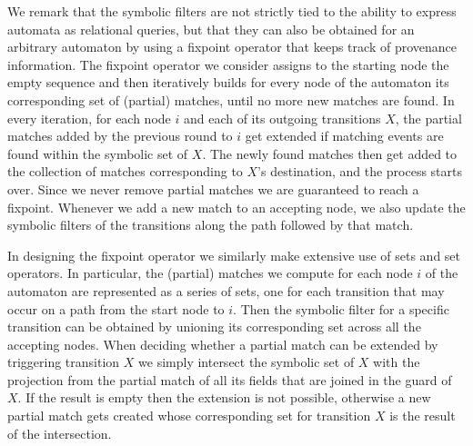 We remark that the symbolic filters are not strictly tied to the ability to 
express automata as relational queries, but that they can also be obtained for 
an arbitrary automaton by using a fixpoint operator that keeps track of 
provenance information.
The fixpoint operator we consider assigns to the starting node the empty 
sequence and then iteratively builds for every node of the automaton its 
corresponding set of (partial) matches, until no more new matches are found. 
In every iteration, for each node $i$ and each of its outgoing transitions $X$, 
the partial matches added by the previous round to $i$ get extended if matching 
events are found within the symbolic set of $X$. 
The newly found matches then get added to the collection of matches 
corresponding to $X$'s destination, and the process starts over.  
Since we never remove partial matches we are guaranteed to reach a fixpoint.
Whenever we add a new match to an accepting node, we also update the symbolic 
filters of the transitions along the path followed by that match.

In designing the fixpoint operator we similarly make extensive use of sets and 
set operators.
In particular, the (partial) matches we compute for each node $i$ of the 
automaton are represented as a series of sets, one for each transition that may 
occur on a path from the start node to $i$.
Then the symbolic filter for a specific transition can be obtained by unioning 
its corresponding set across all the accepting nodes.
When deciding whether a partial match can be extended by triggering transition 
$X$ we simply intersect the symbolic set of $X$ with the projection from the 
partial match of all its fields that are joined in the guard of $X$.
If the result is empty then the extension is not possible, otherwise a new 
partial match gets created whose corresponding set for transition $X$ is the 
result of the intersection.   





 
